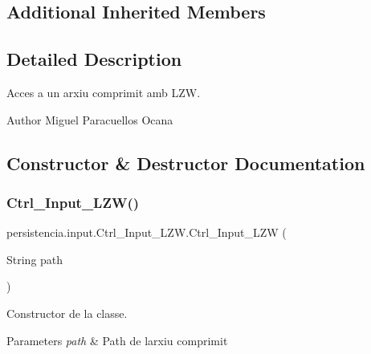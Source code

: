 \subsection*{Additional Inherited Members}


\subsection{Detailed Description}
Acces a un arxiu comprimit amb L\+ZW. 

\begin{DoxyAuthor}{Author}
Miguel Paracuellos Ocana 
\end{DoxyAuthor}


\subsection{Constructor \& Destructor Documentation}
\mbox{\label{classpersistencia_1_1input_1_1Ctrl__Input__LZW_a31503f303ac443e110379322e851791a}} 
\subsubsection{\texorpdfstring{Ctrl\+\_\+\+Input\+\_\+\+L\+Z\+W()}{Ctrl\_Input\_LZW()}\hspace{0.1cm}{\footnotesize\ttfamily [1/2]}}
{\footnotesize\ttfamily persistencia.\+input.\+Ctrl\+\_\+\+Input\+\_\+\+L\+Z\+W.\+Ctrl\+\_\+\+Input\+\_\+\+L\+ZW (\begin{DoxyParamCaption}\item[{String}]{path }\end{DoxyParamCaption})\hspace{0.3cm}{\ttfamily [inline]}}



Constructor de la classe. 


\begin{DoxyParams}{Parameters}
{\em path} & Path de l\textquotesingle{}arxiu comprimit \\
\hline
\end{DoxyParams}

